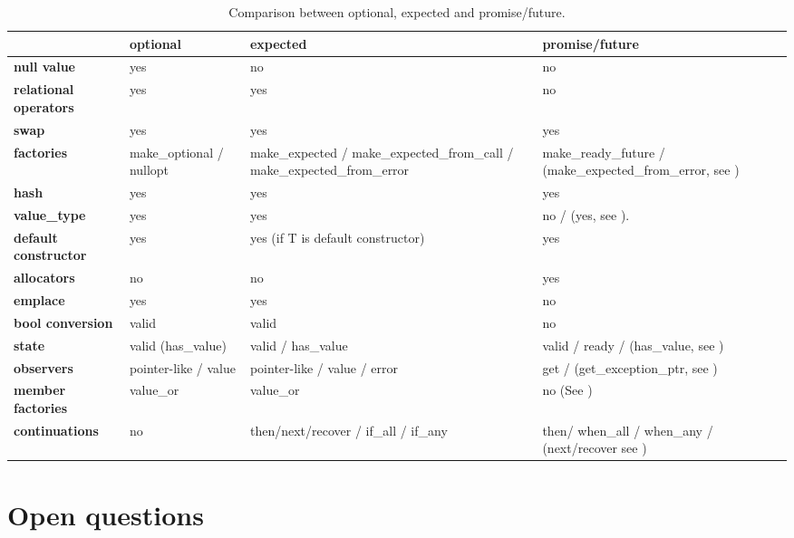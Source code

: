 \documentclass[a4paper,10pt]{article}
\begin{document}
\begin{table}
\bgroup
\def\arraystretch{1.5}
\begin{tabular}{|l|>{\raggedright\arraybackslash}p{4cm}|>{\raggedright\arraybackslash}p{4cm}|>{\raggedright\arraybackslash}p{4cm}|}
\hline
                    & \textbf{optional} & \textbf{expected} & \textbf{promise/future} \\
\hline
\textbf{null value} & yes & no & no \\
\hline
\textbf{relational operators} & yes & yes & no \\
\hline
\textbf{swap} & yes & yes & yes \\
\hline
\textbf{factories} & make_optional / nullopt & make_expected / make_expected_from_call / make_expected_from_error & make_ready_future / (make_expected_from_error, see \cite{MoreAsync}) \\
\hline
\textbf{hash} & yes & yes & yes \\
\hline
\textbf{value_type} & yes & yes & no / (yes, see \cite{MoreAsync}).  \\
\hline
\textbf{default constructor} & yes & yes (if T is default constructor) & yes \\
\hline
\textbf{allocators} & no & no & yes \\
\hline
\textbf{emplace} & yes & yes & no \\
\hline
\textbf{bool conversion} & valid & valid & no \\
\hline
\textbf{state} & valid (has_value) & valid / has_value & valid / ready / (has_value, see \cite{MoreAsync}) \\
\hline
\textbf{observers} & pointer-like / value & pointer-like / value / error & get / (get_exception_ptr, see \cite{MoreAsync}) \\
\hline
\textbf{member factories} & value_or & value_or & no (See \cite{MoreAsync}) \\
\hline
\textbf{continuations} & no & then/next/recover / if_all / if_any & then/ when_all / when_any / (next/recover see \cite{MoreAsync}) \\
\hline
\end{tabular}
\egroup
\caption{Comparison between optional, expected and promise/future.}
\label{comp-monads}
\end{table}



\section{Open questions}
\end{document}
